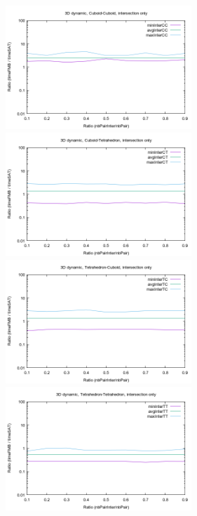 \documentclass[12pt, a4paper]{article}
\begin{document}
\begin{center}
\begin{figure}[H]
\centering\includegraphics[width=7cm]{../Results/qualification3DTimeCCinter.png}
\centering\includegraphics[width=7cm]{../Results/qualification3DTimeCTinter.png}
\centering\includegraphics[width=7cm]{../Results/qualification3DTimeTCinter.png}
\centering\includegraphics[width=7cm]{../Results/qualification3DTimeTTinter.png}
\end{figure}
\end{center}
\end{document}
